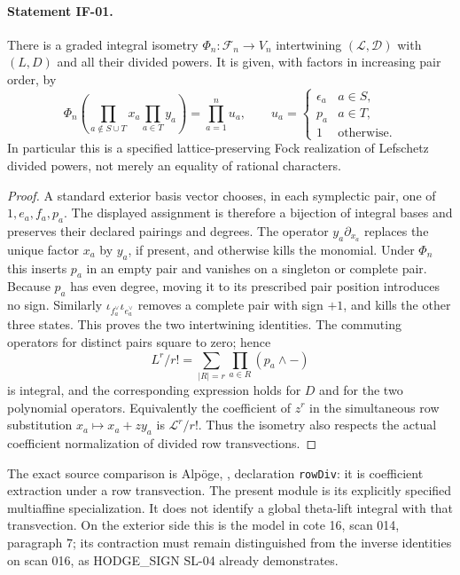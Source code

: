 \documentclass[11pt,a4paper]{article}
\theoremstyle{definition}
\theoremstyle{remark}
\begin{document}
\paragraph{Statement IF-01.}
There is a graded integral isometry $\Phi_n:\mathcal F_n\longrightarrow V_n$
intertwining $(\mathscr L,\mathscr D)$ with $(L,D)$ and all their divided
powers. It is given, with factors in increasing pair order, by
\[
 \Phi_n\left(\prod_{a\notin S\cup T}x_a\prod_{a\in T}y_a\right)
 =\prod_{a=1}^n u_a,\qquad
 u_a=\begin{cases}\epsilon_a&a\in S,\\p_a&a\in T,\\1&\text{otherwise}.
 \end{cases}
\]
In particular this is a specified lattice-preserving Fock realization of
Lefschetz divided powers, not merely an equality of rational characters.

\begin{proof}
A standard exterior basis vector chooses, in each symplectic pair, one of
$1,e_a,f_a,p_a$. The displayed assignment is therefore a bijection of
integral bases and preserves their declared pairings and degrees.
The operator $y_a\partial_{x_a}$ replaces the unique factor $x_a$ by
$y_a$, if present, and otherwise kills the monomial. Under $\Phi_n$ this
inserts $p_a$ in an empty pair and vanishes on a singleton or complete
pair. Because $p_a$ has even degree, moving it to its prescribed pair
position introduces no sign. Similarly
$\iota_{f_a^\vee}\iota_{e_a^\vee}$ removes a complete pair with sign $+1$,
and kills the other three states. This proves the two intertwining
identities. The commuting operators for distinct pairs square to zero;
hence
\[
 L^r/r!=\sum_{|R|=r}\prod_{a\in R}(p_a\wedge-)
\]
is integral, and the corresponding expression holds for $D$ and for the
two polynomial operators. Equivalently the coefficient of $z^r$ in the
simultaneous row substitution $x_a\mapsto x_a+zy_a$ is
$\mathscr L^r/r!$. Thus the isometry also respects the actual coefficient
normalization of divided row transvections.
\end{proof}

The exact source comparison is Alp\"oge,
, declaration
\texttt{rowDiv}: it is coefficient extraction under a row transvection.
The present module is its explicitly specified multiaffine specialization.
It does not identify a global theta-lift integral with that transvection.
On the exterior side this is the model in cote 16, scan 014, paragraph 7;
its contraction must remain distinguished from the inverse identities on
scan 016, as HODGE\_SIGN SL-04 already demonstrates.
\end{document}
